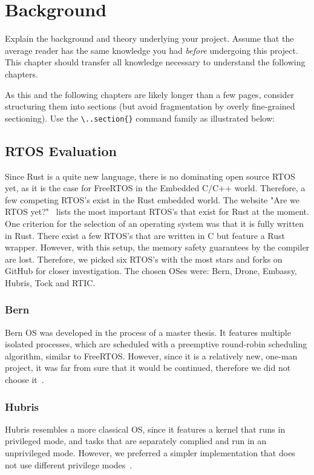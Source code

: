 \chapter{Background}
\label{ch:background}

Explain the background and theory underlying your project.
Assume that the average reader has the same knowledge you had \emph{before} undergoing this project.
This chapter should transfer all knowledge necessary to understand the following chapters.

As this and the following chapters are likely longer than a few pages, consider structuring them into sections (but avoid fragmentation by overly fine-grained sectioning).
Use the \verb|\..section{}| command family as illustrated below:

\section{RTOS Evaluation}
\label{sec:rtos_evaluation}

Since Rust is a quite new language, there is no dominating open source RTOS yet, as it is the case for FreeRTOS in the Embedded C/C++ world.
Therefore, a few competing RTOS's exist in the Rust embedded world.
The website "Are we RTOS yet?"~\cite{AWRY} lists the most important RTOS's that exist for Rust at the moment.
One criterion for the selection of an operating system was that it is fully written in Rust.
There exist a few RTOS's that are written in C but feature a Rust wrapper.
However, with this setup, the memory safety guarantees by the compiler are lost.
Therefore, we picked six RTOS's with the most stars and forks on GitHub for closer investigation. The chosen OSes were: Bern, Drone, Embassy, Hubris, Tock and RTIC. 

\subsection{Bern}
Bern OS was developed in the process of a master thesis. It features multiple isolated processes, which are scheduled with a preemptive round-robin scheduling algorithm, similar to FreeRTOS. However, since it is a relatively new, one-man project, it was far from sure that it would be continued, therefore we did not choose it~\cite{Bern}.

\subsection{Hubris}
Hubris resembles a more classical OS, since it features a kernel that runs in privileged mode, and tasks that are separately complied and run in an unprivileged mode. However, we preferred a simpler implementation that does not use different privilege modes~\cite{Hubris}. 

